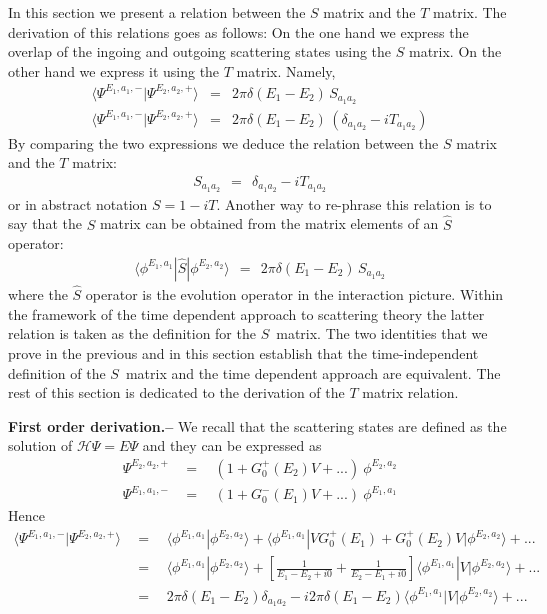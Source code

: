 \documentclass[onecolumn,fleqn]{revtex4}
\newcommand{\beq}{\begin{eqnarray}}
\newcommand{\eeq}{\end{eqnarray}}
\begin{document}
In this section we present a relation  
between the $S$ matrix and the $T$ matrix. 
The derivation of this relations 
goes as follows: On the one hand 
we express the overlap of the ingoing and outgoing 
scattering states using the $S$ matrix. On the other 
hand we express it using the $T$ matrix. Namely, 
\beq
\langle \Psi^{E_{1},a_{1},-}|\Psi^{E_{2},a_{2},+}\rangle 
&=& 2\pi\delta(E_{1}-E_{2}) \, S_{a_{1}a_{2}}
\\ \nonumber
\langle \Psi^{E_{1},a_{1},-}|\Psi^{E_{2},a_{2},+}\rangle 
&=& 2\pi\delta(E_{1}-E_{2}) \, (\delta_{a_{1}a_{2}}-iT_{a_{1}a_{2}}) 
\eeq
By comparing the two expressions we deduce the relation between 
the $S$ matrix and the $T$ matrix:   
\beq
S_{a_{1}a_{2}} \ \ = \ \ \delta_{a_{1}a_{2}}-iT_{a_{1}a_{2}}
\eeq
or in abstract notation $S=1-iT$.  
Another way to re-phrase this relation is 
to say that the $S$ matrix can be obtained 
from the matrix elements of an $\hat{S}$ operator:
\beq
\langle \phi^{E_{1},a_{1}} | \hat{S} | \phi^{E_{2},a_{2}}\rangle
\ \ = \ \  2\pi\delta(E_{1}-E_{2}) \, S_{a_{1}a_{2}}
\eeq
where the $\hat{S}$ operator is the evolution operator 
in the interaction picture. Within the framework 
of the time dependent approach to scattering theory the 
latter relation is taken as the definition for the $S$~matrix. 
The two identities that we prove in the previous and in this 
section establish that the time-independent definition 
of the $S$~matrix and the time dependent approach are equivalent.    
The rest of this section is dedicated to the derivation 
of the $T$ matrix relation. 

{\bf First order derivation.-- } 
We recall that the scattering states 
are defined as the solution of $\mathcal{H}\Psi=E\Psi$ 
and they can be expressed as  
\beq
\Psi^{E_2,a_2,+} \ \ &=& \ \ \left(1+G_0^{+}(E_2)V + ...\right) \ \phi^{E_2,a_2}
\\
\Psi^{E_1,a_1,-} \ \ &=& \ \ \left(1+G_0^{-}(E_1)V + ...\right) \ \phi^{E_1,a_1}
\eeq
Hence
\beq
\langle \Psi^{E_1,a_1,-}|\Psi^{E_2,a_2,+} \rangle 
\ \ &=& \ \ 
\langle \phi^{E_1,a_1}|\phi^{E_2,a_2} \rangle 
+ \langle \phi^{E_1,a_1}|VG_0^{+}(E_1)+G_0^{+}(E_2)V|\phi^{E_2,a_2} \rangle + ...
\\
\ \ &=& \ \
\langle \phi^{E_1,a_1}|\phi^{E_2,a_2} \rangle
+ \left[ \frac{1}{E_1-E_2+i0} + \frac{1}{E_2-E_1+i0} \right] \langle \phi^{E_1,a_1}|V|\phi^{E_2,a_2} \rangle + ...
\\
\ \ &=& \ \
2\pi\delta(E_{1}-E_{2}) \delta_{a_{1}a_{2}}
- i2\pi\delta(E_{1}-E_{2})
\langle \phi^{E_1,a_1} \left|V\right|\phi^{E_2,a_2}\rangle + ...
\eeq
\end{document}
